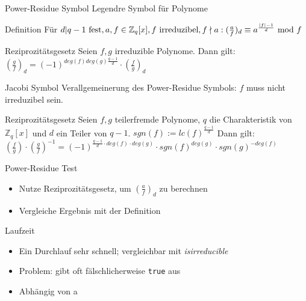\documentclass[german,10pt,xcolor=colortbl,compress]{beamer}%
\newcommand{\ZZ}{\mathbb{Z}}
\begin{document}
	\begin{frame}{Power-Residue Symbol}
		Legendre Symbol für Polynome 
		\begin{block}{Definition}
			Für $d|q-1 \text{ fest},  a,f \in \ZZ_q[x], f \text{ irreduzibel}, f \nmid a: 
			\newline 	
			(\frac{a}{f})_d  \equiv a^{\frac{|f|-1}{d}} \text{ mod } f$
		\end{block}
	
		\begin{block}{Reziprozitätsgesetz}
			Seien $f,g$ irreduzible Polynome. Dann gilt:
			$(\frac{g}{f})_d=(-1)^{deg(f)deg(g)\frac{q-1}{d}} \cdot (\frac{f}{g})_d $ 				
		\end{block}
	\end{frame}

	
	\begin{frame}{Jacobi Symbol}
		Verallgemeinerung des Power-Residue Symbols: $f$ muss nicht irreduzibel sein.
		
		\begin{block}{Reziprozitätsgesetz}
			Seien $f,g$ teilerfremde Polynome, $q$ die Charakteristik von $\ZZ_q[x]$ und $d$ ein Teiler von $q-1$.
			$sgn(f):=lc(f)^{\frac{q-1}{d}}$ 
			Dann gilt:
			$\left(\frac{f}{g}\right) \cdot \left(\frac{g}{f}\right)^{-1} = (-1)^{\frac{q-1}{d} \cdot deg(f)\cdot deg(g)}\cdot sgn(f)^{deg(g)} \cdot sgn(g)^{-deg(f)} $
							
		\end{block}
	\end{frame}

	
	\begin{frame}{Power-Residue Test}
		\begin{itemize}
		\item Nutze Reziprozitätsgesetz, um $(\frac{a}{f})_d $ zu berechnen
		\item Vergleiche Ergebnis mit der Definition
		\end{itemize}
	\end{frame}

	
	\begin{frame}{Laufzeit}
		\begin{itemize}
			\item Ein Durchlauf sehr schnell; vergleichbar mit \textit{isirreducible}
			\item Problem: gibt oft fälschlicherweise \texttt{true} aus
			\item Abhängig von a
		\end{itemize}
	\end{frame}
\end{document}
